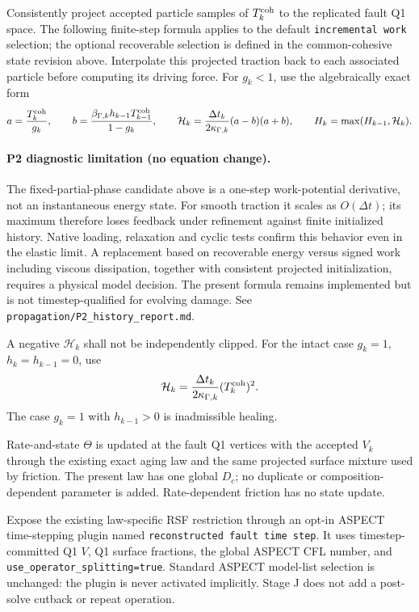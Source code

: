 \documentclass[11pt]{article}
\begin{document}
Consistently project accepted particle samples of $T_k^{\rm coh}$ to the
replicated fault Q1 space.
The following finite-step formula applies to the default \texttt{incremental work}
selection; the optional recoverable selection is defined in the common-cohesive
state revision above. Interpolate this projected traction back to each
associated particle before computing its driving force. For $g_k<1$, use the
algebraically exact form
\begin{equation}
 a=\frac{T_k^{\rm coh}}{g_k},\qquad
 b=\frac{\beta_{\Gamma,k}h_{k-1}T_{k-1}^{\rm coh}}{1-g_k},\qquad
 \mathcal H_k=\frac{\Delta t_k}{2\kappa_{\Gamma,k}}(a-b)(a+b),
 \qquad H_k=\max(H_{k-1},\mathcal H_k).
\end{equation}

\paragraph{P2 diagnostic limitation (no equation change).}
The fixed-partial-phase candidate above is a one-step work-potential derivative,
not an instantaneous energy state. For smooth traction it scales as
$O(\Delta t)$; its maximum therefore loses feedback under refinement against
finite initialized history. Native loading, relaxation and cyclic tests confirm
this behavior even in the elastic limit. A replacement based on recoverable
energy versus signed work including viscous dissipation, together with consistent
projected initialization, requires a physical model decision. The present
formula remains implemented but is not timestep-qualified for evolving damage.
See \texttt{propagation/P2\_history\_report.md}.

A negative $\mathcal H_k$ shall not be independently clipped. For the intact
case $g_k=1$, $h_k=h_{k-1}=0$, use
\begin{equation}
 \mathcal H_k=\frac{\Delta t_k}{2\kappa_{\Gamma,k}}(T_k^{\rm coh})^2.
\end{equation}
The case $g_k=1$ with $h_{k-1}>0$ is inadmissible healing.

Rate-and-state $\Theta$ is updated at the fault Q1 vertices with the accepted
$V_k$ through the existing exact aging law and the same projected surface
mixture used by friction. The present law has one global $D_c$; no duplicate
or composition-dependent parameter is added. Rate-dependent friction has no
state update.

Expose the existing law-specific RSF restriction through an opt-in ASPECT
time-stepping plugin named \texttt{reconstructed fault time step}. It uses
timestep-committed Q1 $V$, Q1 surface fractions, the global ASPECT CFL number,
and \texttt{use\_operator\_splitting=true}. Standard ASPECT model-list
selection is unchanged: the plugin is never activated implicitly. Stage J
does not add a post-solve cutback or repeat operation.
\end{document}
